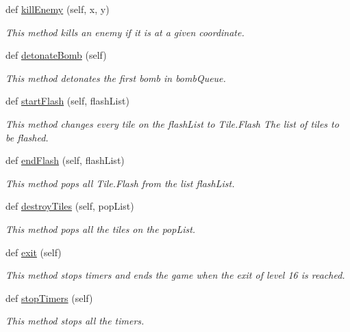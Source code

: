 \begin{DoxyCompactItemize}
def \hyperlink{classsrc_1_1board_1_1_board_a4e6bd40bde952bdbe12653269da596f5}{kill\+Enemy} (self, x, y)
\begin{DoxyCompactList}\small\item\em This method kills an enemy if it is at a given coordinate. \end{DoxyCompactList}\item 
def \hyperlink{classsrc_1_1board_1_1_board_a801979e5433ee99d7e36a4c648b3f930}{detonate\+Bomb} (self)
\begin{DoxyCompactList}\small\item\em This method detonates the first bomb in bomb\+Queue. \end{DoxyCompactList}\item 
def \hyperlink{classsrc_1_1board_1_1_board_a39006efbb358f5be11d11c3a2775a2f0}{start\+Flash} (self, flash\+List)
\begin{DoxyCompactList}\small\item\em This method changes every tile on the flash\+List to Tile.\+Flash  The list of tiles to be flashed. \end{DoxyCompactList}\item 
def \hyperlink{classsrc_1_1board_1_1_board_a1a709b1fbf97db6da5740b7aeac1fad8}{end\+Flash} (self, flash\+List)
\begin{DoxyCompactList}\small\item\em This method pops all Tile.\+Flash from the list flash\+List. \end{DoxyCompactList}\item 
def \hyperlink{classsrc_1_1board_1_1_board_a537d8c1c7d64aebc960da0f0b34ef44c}{destroy\+Tiles} (self, pop\+List)
\begin{DoxyCompactList}\small\item\em This method pops all the tiles on the pop\+List. \end{DoxyCompactList}\item 
def \hyperlink{classsrc_1_1board_1_1_board_a718f3d710ba5aa31fb49da72d37c450a}{exit} (self)
\begin{DoxyCompactList}\small\item\em This method stops timers and ends the game when the exit of level 16 is reached. \end{DoxyCompactList}\item 
def \hyperlink{classsrc_1_1board_1_1_board_a218749642f3aec8d8daaaf6be61cf0a9}{stop\+Timers} (self)
\begin{DoxyCompactList}\small\item\em This method stops all the timers. \end{DoxyCompactList}\item 

\end{DoxyCompactItemize}
